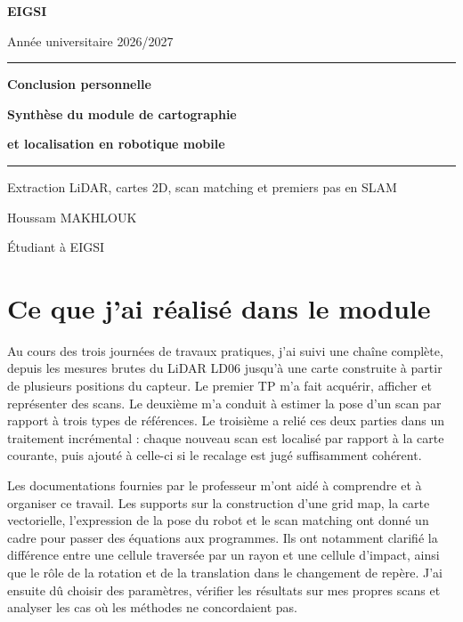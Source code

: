 \documentclass[11pt,a4paper]{article}
\begin{document}
\hypersetup{pageanchor=false}
\begin{titlepage}
\centering
\vspace*{1.5cm}
{\Large\bfseries EIGSI\par}
\vspace{0.35cm}
{\large Année universitaire 2026/2027\par}
\vspace{2cm}
{\color{blue!45!black}\rule{0.88\textwidth}{1.2pt}\par}
\vspace{0.65cm}
{\Huge\bfseries Conclusion personnelle\par}
\vspace{0.3cm}
{\LARGE\bfseries Synthèse du module de cartographie\par}
{\LARGE\bfseries et localisation en robotique mobile\par}
\vspace{0.65cm}
{\color{blue!45!black}\rule{0.88\textwidth}{1.2pt}\par}
\vspace{1cm}
{\large Extraction LiDAR, cartes 2D, scan matching et premiers pas en SLAM\par}
\vfill
{\large Houssam MAKHLOUK\par}
{\large Étudiant à EIGSI\par}
\vspace*{1cm}
\end{titlepage}

\hypersetup{pageanchor=true}
\tableofcontents
\clearpage

\section{Ce que j'ai réalisé dans le module}
Au cours des trois journées de travaux pratiques, j'ai suivi une chaîne complète, depuis les mesures brutes du LiDAR LD06 jusqu'à une carte construite à partir de plusieurs positions du capteur. Le premier TP m'a fait acquérir, afficher et représenter des scans. Le deuxième m'a conduit à estimer la pose d'un scan par rapport à trois types de références. Le troisième a relié ces deux parties dans un traitement incrémental : chaque nouveau scan est localisé par rapport à la carte courante, puis ajouté à celle-ci si le recalage est jugé suffisamment cohérent.

Les documentations fournies par le professeur m'ont aidé à comprendre et à organiser ce travail. Les supports sur la construction d'une grid map, la carte vectorielle, l'expression de la pose du robot et le scan matching ont donné un cadre pour passer des équations aux programmes. Ils ont notamment clarifié la différence entre une cellule traversée par un rayon et une cellule d'impact, ainsi que le rôle de la rotation et de la translation dans le changement de repère. J'ai ensuite dû choisir des paramètres, vérifier les résultats sur mes propres scans et analyser les cas où les méthodes ne concordaient pas.
\end{document}
